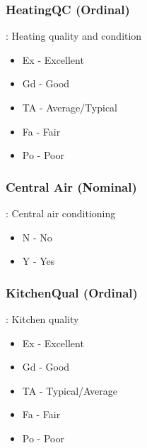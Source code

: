 \documentclass[sigconf]{acmart}
\begin{document}
	\subsubsection{HeatingQC (Ordinal)}: Heating quality and condition
	\begin{itemize}
		\item  Ex - Excellent
		\item  Gd - Good
		\item  TA - Average/Typical
		\item  Fa - Fair
		\item  Po - Poor
	\end{itemize}
	
	\subsubsection{Central Air (Nominal)}: Central air conditioning
	\begin{itemize}
		\item  N - No
		\item  Y - Yes
	\end{itemize}
	
	\subsubsection{KitchenQual (Ordinal)}: Kitchen quality
	\begin{itemize}
		\item  Ex - Excellent
		\item  Gd - Good
		\item  TA - Typical/Average
		\item  Fa - Fair
		\item  Po - Poor
	\end{itemize}
	
\end{document}
